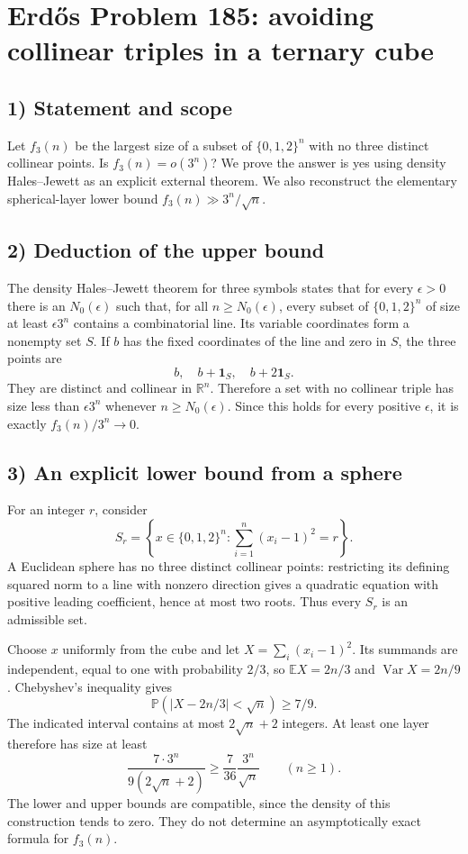 \section{Erd\H{o}s Problem 185: avoiding collinear triples in a ternary cube}

\subsection{1) Statement and scope}
Let $f_3(n)$ be the largest size of a subset of $\{0,1,2\}^n$ with
no three distinct collinear points. Is $f_3(n)=o(3^n)$?
We prove the answer is yes using density Hales--Jewett as an explicit
external theorem. We also reconstruct the elementary spherical-layer
lower bound $f_3(n)\gg3^n/\sqrt n$.

\subsection{2) Deduction of the upper bound}
The density Hales--Jewett theorem for three symbols states that for
every $\epsilon>0$ there is an $N_0(\epsilon)$ such that, for all
$n\geq N_0(\epsilon)$, every subset of $\{0,1,2\}^n$ of size at least
$\epsilon3^n$ contains a combinatorial line. Its variable coordinates
form a nonempty set $S$. If $b$ has the fixed coordinates of the line
and zero in $S$, the three points are
\[
 b,\quad b+\mathbf1_S,\quad b+2\mathbf1_S.
\]
They are distinct and collinear in $\mathbb R^n$. Therefore a set with
no collinear triple has size less than $\epsilon3^n$ whenever
$n\geq N_0(\epsilon)$. Since this holds for every positive $\epsilon$,
it is exactly $f_3(n)/3^n\to0$.

\subsection{3) An explicit lower bound from a sphere}
For an integer $r$, consider
\[
 S_r=\left\{x\in\{0,1,2\}^n:
             \sum_{i=1}^n(x_i-1)^2=r\right\}.
\]
A Euclidean sphere has no three distinct collinear points: restricting
its defining squared norm to a line with nonzero direction gives a
quadratic equation with positive leading coefficient, hence at most
two roots. Thus every $S_r$ is an admissible set.

Choose $x$ uniformly from the cube and let
$X=\sum_i(x_i-1)^2$. Its summands are independent, equal to one with
probability $2/3$, so
$\mathbb EX=2n/3$ and $\operatorname{Var}X=2n/9$.
Chebyshev's inequality gives
\[
 \mathbb P(|X-2n/3|<\sqrt n)\geq7/9.
\]
The indicated interval contains at most $2\sqrt n+2$ integers. At least
one layer therefore has size at least
\[
 \frac{7\cdot3^n}{9(2\sqrt n+2)}
 \geq\frac7{36}\frac{3^n}{\sqrt n}\qquad(n\geq1).
\]
The lower and upper bounds are compatible, since the density of this
construction tends to zero. They do not determine an asymptotically
exact formula for $f_3(n)$.

